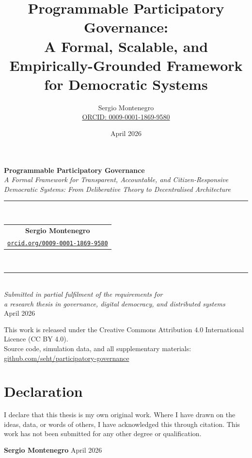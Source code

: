 \documentclass[12pt,a4paper,oneside]{report}
\title{%
  \textbf{Programmable Participatory Governance:}\\[4pt]
  A Formal, Scalable, and Empirically-Grounded Framework\\
  for Democratic Systems
}
\author{%
  Sergio Montenegro\\[4pt]
  \small\href{https://orcid.org/0009-0001-1869-9580}{ORCID: 0009-0001-1869-9580}
}
\date{April 2026}
\begin{document}
\begin{titlepage}
\centering
\vspace*{2cm}
{\LARGE\bfseries Programmable Participatory Governance}\\[1em]
{\large\itshape A Formal Framework for Transparent, Accountable, and Citizen-Responsive\\
Democratic Systems: From Deliberative Theory to Decentralised Architecture}\\[3cm]
\rule{0.7\textwidth}{0.4pt}\\[0.5em]
{\normalsize
\begin{tabular}{c}
\textbf{Sergio Montenegro} \\
\href{https://orcid.org/0009-0001-1869-9580}{\texttt{orcid.org/0009-0001-1869-9580}}
\end{tabular}
}\\[0.5em]
\rule{0.7\textwidth}{0.4pt}\\[2.5cm]
{\normalsize\textit{Submitted in partial fulfilment of the requirements for\\
a research thesis in governance, digital democracy, and distributed systems}}\\[0.6em]
{\normalsize April 2026}\\[3cm]
\vfill
\begin{footnotesize}
This work is released under the Creative Commons Attribution 4.0 International Licence (CC BY 4.0).\\[0.3em]
Source code, simulation data, and all supplementary materials:\\[0.2em]
\href{https://github.com/seht/participatory-governance}{github.com/seht/participatory-governance}
\end{footnotesize}
\end{titlepage}

\chapter*{Declaration}
\thispagestyle{plain}

I declare that this thesis is my own original work. Where I have drawn on the ideas, data, or words of others, I have acknowledged this through citation. This work has not been submitted for any other degree or qualification.

\vspace{2.5cm}
\noindent\textbf{Sergio Montenegro} \hfill April 2026
\clearpage
\end{document}
